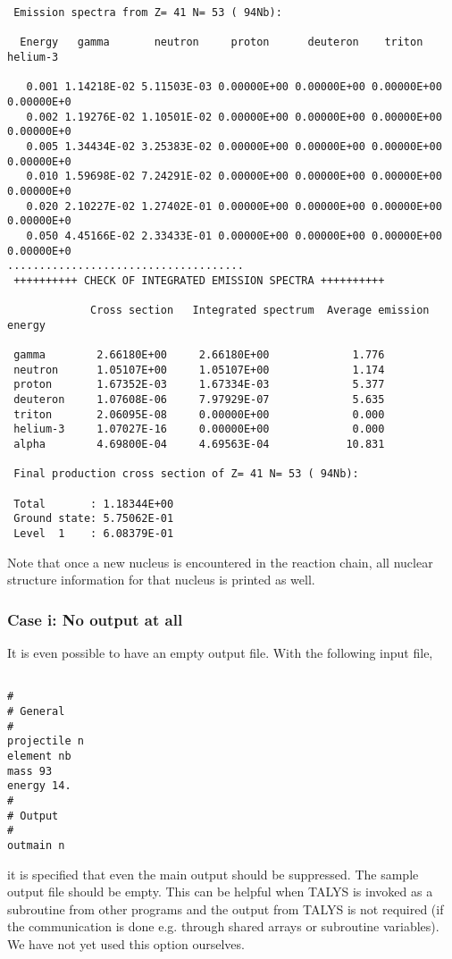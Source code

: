\begin{samplecase}
{\begin{verbatim}
 Emission spectra from Z= 41 N= 53 ( 94Nb):
   
  Energy   gamma       neutron     proton      deuteron    triton      helium-3 

   0.001 1.14218E-02 5.11503E-03 0.00000E+00 0.00000E+00 0.00000E+00 0.00000E+0
   0.002 1.19276E-02 1.10501E-02 0.00000E+00 0.00000E+00 0.00000E+00 0.00000E+0
   0.005 1.34434E-02 3.25383E-02 0.00000E+00 0.00000E+00 0.00000E+00 0.00000E+0
   0.010 1.59698E-02 7.24291E-02 0.00000E+00 0.00000E+00 0.00000E+00 0.00000E+0
   0.020 2.10227E-02 1.27402E-01 0.00000E+00 0.00000E+00 0.00000E+00 0.00000E+0
   0.050 4.45166E-02 2.33433E-01 0.00000E+00 0.00000E+00 0.00000E+00 0.00000E+0
.....................................
 ++++++++++ CHECK OF INTEGRATED EMISSION SPECTRA ++++++++++
   
             Cross section   Integrated spectrum  Average emission energy
 
 gamma        2.66180E+00     2.66180E+00             1.776
 neutron      1.05107E+00     1.05107E+00             1.174
 proton       1.67352E-03     1.67334E-03             5.377
 deuteron     1.07608E-06     7.97929E-07             5.635
 triton       2.06095E-08     0.00000E+00             0.000
 helium-3     1.07027E-16     0.00000E+00             0.000
 alpha        4.69800E-04     4.69563E-04            10.831
   
 Final production cross section of Z= 41 N= 53 ( 94Nb):    
  
 Total       : 1.18344E+00
 Ground state: 5.75062E-01
 Level  1    : 6.08379E-01
\end{verbatim} } \renewcommand{\baselinestretch}{1.07}\small\normalsize
\noindent
Note that once a new nucleus is encountered in the reaction chain, all nuclear 
structure information for that nucleus is printed as well.
\subsubsection{Case i: No output at all}
It is even possible to have an empty output file. With the following input file,

{\small \begin{verbatim}

#
# General
#
projectile n
element nb
mass 93
energy 14.
#
# Output
#
outmain n
\end{verbatim} } \renewcommand{\baselinestretch}{1.07}\small\normalsize
\noindent
it is specified that even the main output should be suppressed. 
The sample output file should be empty. This can be helpful 
when TALYS is invoked as a subroutine from other programs and the output from 
TALYS is not required (if the communication is done e.g. through 
shared arrays or subroutine variables). We have not yet used this option
ourselves.
\end{samplecase}
